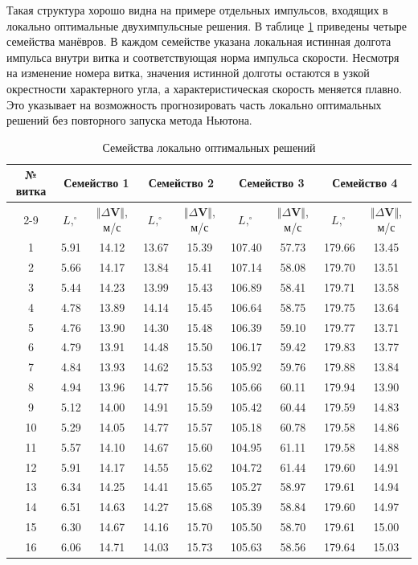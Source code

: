 Такая структура хорошо видна на примере отдельных импульсов, входящих в локально оптимальные двухимпульсные решения. В таблице \ref{tab::optimal_man_family} приведены четыре семейства манёвров. В каждом семействе указана локальная истинная долгота импульса внутри витка и соответствующая норма импульса скорости. Несмотря на изменение номера витка, значения истинной долготы остаются в узкой окрестности характерного угла, а характеристическая скорость меняется плавно. Это указывает на возможность прогнозировать часть локально оптимальных решений без повторного запуска метода Ньютона.

\begin{table}[!htbp]
\centering
\caption{Семейства локально оптимальных решений}
\label{tab::optimal_man_family}
\renewcommand{\arraystretch}{1.12}
\setlength{\tabcolsep}{3pt}
\begin{tabular}{|c|cc|cc|cc|cc|}
\hline
\multirow{2}{*}{№ витка}
& \multicolumn{2}{c|}{Семейство 1}
& \multicolumn{2}{c|}{Семейство 2}
& \multicolumn{2}{c|}{Семейство 3}
& \multicolumn{2}{c|}{Семейство 4} \\
\cline{2-9}
& $L,^\circ$ & $\Vert \Delta \mathbf{V} \Vert$, м/с
& $L,^\circ$ & $\Vert \Delta \mathbf{V} \Vert$, м/с
& $L,^\circ$ & $\Vert \Delta \mathbf{V} \Vert$, м/с
& $L,^\circ$ & $\Vert \Delta \mathbf{V} \Vert$, м/с \\
\hline
1  &   5.91 & 14.12 & 13.67 & 15.39 & 107.40 & 57.73 & 179.66 & 13.45 \\
2  &   5.66 & 14.17 & 13.84 & 15.41 & 107.14 & 58.08 & 179.70 & 13.51 \\
3  &   5.44 & 14.23 & 13.99 & 15.43 & 106.89 & 58.41 & 179.71 & 13.58 \\
4  &   4.78 & 13.89 & 14.14 & 15.45 & 106.64 & 58.75 & 179.75 & 13.64 \\
5  &   4.76 & 13.90 & 14.30 & 15.48 & 106.39 & 59.10 & 179.77 & 13.71 \\
6  &   4.79 & 13.91 & 14.48 & 15.50 & 106.17 & 59.42 & 179.83 & 13.77 \\
7  &   4.84 & 13.93 & 14.62 & 15.53 & 105.92 & 59.76 & 179.88 & 13.84 \\
8  &   4.94 & 13.96 & 14.77 & 15.56 & 105.66 & 60.11 & 179.94 & 13.90 \\
9  &   5.12 & 14.00 & 14.91 & 15.59 & 105.42 & 60.44 & 179.59 & 14.83 \\
10 &   5.29 & 14.05 & 14.77 & 15.57 & 105.18 & 60.78 & 179.58 & 14.86 \\
11 &   5.57 & 14.10 & 14.67 & 15.60 & 104.95 & 61.11 & 179.58 & 14.88 \\
12 &   5.91 & 14.17 & 14.55 & 15.62 & 104.72 & 61.44 & 179.60 & 14.91 \\
13 &   6.34 & 14.25 & 14.41 & 15.65 & 105.27 & 58.97 & 179.61 & 14.94 \\
14 &   6.51 & 14.63 & 14.27 & 15.68 & 105.39 & 58.84 & 179.60 & 14.97 \\
15 &   6.30 & 14.67 & 14.16 & 15.70 & 105.50 & 58.70 & 179.61 & 15.00 \\
16 &   6.06 & 14.71 & 14.03 & 15.73 & 105.63 & 58.56 & 179.64 & 15.03 \\
\hline
\end{tabular}
\end{table}

